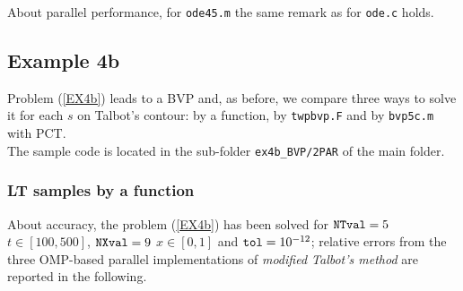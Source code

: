 \documentclass[a4paper,10pt]{report}%
\begin{document}
\noindent About parallel performance, for {\tt ode45.m} the same remark as for {\tt ode.c} holds.


\newpage
\subsection{Example 4b}
Problem (\ref{EX4b}) leads to a BVP and, as before, we compare three ways to solve it for each $s$ on
Talbot's contour: by a function, by {\tt twpbvp.F} and by {\tt bvp5c.m} with PCT.
\\
The sample code is located in the sub-folder {\tt ex4b\_BVP/2PAR} of the main folder.


\subsubsection{LT samples by a function}
About accuracy, the problem (\ref{EX4b}) has been solved for ${\tt NTval}=5$ $t\in[100, 500]$,
${\tt NXval}=9$ $x\in[0,1]$ and ${\tt tol}=10^{-12}$; relative errors from the three OMP-based parallel
implementations of {\em modified Talbot's method} are reported in the following.
\end{document}
